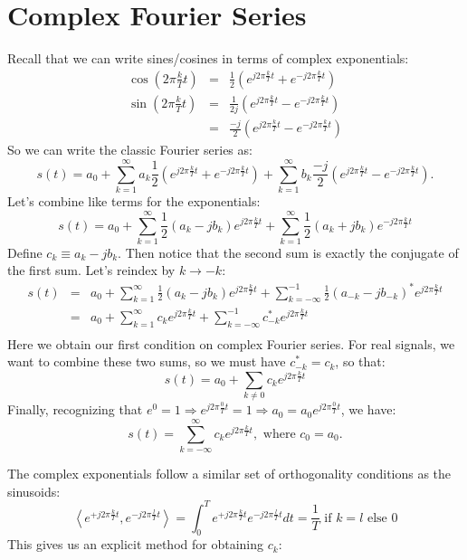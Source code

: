 \documentclass[11pt]{article}
\begin{document}
\section*{Complex Fourier Series}

Recall that we can write sines/cosines in terms of complex exponentials:
\begin{eqnarray*}
\cos{\left(2 \pi \frac{k}{T} t \right)} &=& \frac{1}{2} \left( e^{j 2 \pi \frac{k}{T} t} + e^{-j 2 \pi \frac{k}{T} t} \right)\\
\sin{\left(2 \pi \frac{k}{T} t \right)} &=& \frac{1}{2j} \left( e^{j 2 \pi \frac{k}{T} t} - e^{-j 2 \pi \frac{k}{T} t} \right) \\
&=& \frac{-j}{2} \left( e^{j 2 \pi \frac{k}{T} t} - e^{-j 2 \pi \frac{k}{T} t} \right)
\end{eqnarray*}
So we can write the classic Fourier series as:
\[s(t) = a_0 + \sum_{k=1}^{\infty} a_k \frac{1}{2} \left( e^{j 2 \pi \frac{k}{T} t} + e^{-j 2 \pi \frac{k}{T} t} \right) + \sum_{k=1}^{\infty} b_k \frac{-j}{2} \left( e^{j 2 \pi \frac{k}{T} t} - e^{-j 2 \pi \frac{k}{T} t} \right). \]
Let's combine like terms for the exponentials:
\[s(t) = a_0 + \sum_{k=1}^{\infty} \frac{1}{2}(a_k - jb_k) e^{j 2 \pi \frac{k}{T} t} + \sum_{k=1}^{\infty} \frac{1}{2}(a_k + jb_k) e^{-j 2 \pi \frac{k}{T} t} \]
Define $\boxed{c_k \equiv a_k - j b_k}$. Then notice that the second sum is exactly the conjugate of the first sum. Let's reindex by $k \to -k$:
\begin{eqnarray*}
s(t) &=& a_0 + \sum_{k=1}^{\infty} \frac{1}{2}(a_k - jb_k) e^{j 2 \pi \frac{k}{T} t} + \sum_{k=-\infty}^{-1} \frac{1}{2}(a_{-k} - jb_{-k})^{*} e^{j 2 \pi \frac{k}{T} t} \\
&=& a_0 + \sum_{k=1}^{\infty} c_k e^{j 2 \pi \frac{k}{T} t} + \sum_{k=-\infty}^{-1} c_{-k}^{*} e^{j 2 \pi \frac{k}{T} t} \\
\end{eqnarray*}
Here we obtain our first condition on complex Fourier series. For real signals, we want to combine these two sums, so we must have $\boxed{c_{-k}^{*} = c_k}$, so that:
\[s(t) = a_0 + \sum_{k\neq 0} c_k e^{j 2 \pi \frac{k}{T} t} \]
Finally, recognizing that $e^0 = 1 \Rightarrow e^{j 2 \pi \frac{0}{T} t} = 1 \Rightarrow a_0 = a_0 e^{j 2 \pi \frac{0}{T} t}$, we have: 
\[s(t) = \sum_{k = -\infty}^{\infty} c_k e^{j 2 \pi \frac{k}{T} t}, \mbox{ where } \boxed{c_0 = a_0}. \]

\noindent The complex exponentials follow a similar set of orthogonality conditions as the sinusoids:
\[\left\langle e^{+j 2 \pi \frac{k}{T} t}, e^{-j 2 \pi \frac{l}{T} t} \right\rangle = \int_0^T e^{+j 2 \pi \frac{k}{T} t} e^{-j 2 \pi \frac{l}{T} t} dt = \frac{1}{T} \mbox{ if } k = l \mbox{ else } 0\]
This gives us an explicit method for obtaining $c_k$:
\end{document}
